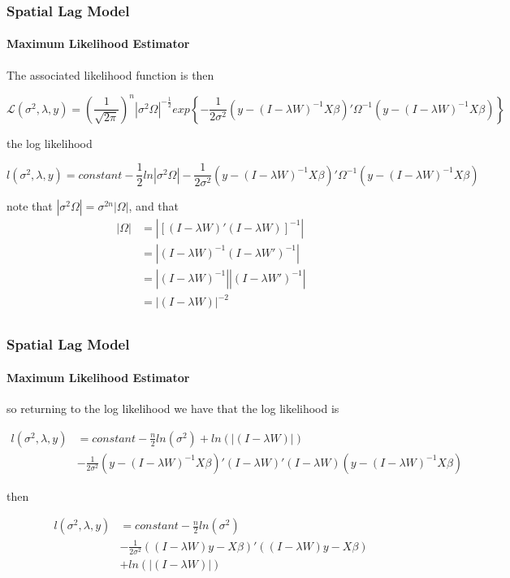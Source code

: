 \documentclass[
  shownotes,
  xcolor={svgnames},
  hyperref={colorlinks,citecolor=DarkBlue,linkcolor=DarkRed,urlcolor=DarkBlue}
  , aspectratio=169]{beamer}
\begin{document}
\begin{frame}[fragile]
\frametitle{Spatial Lag Model}
\framesubtitle{Maximum Likelihood Estimator}


The associated likelihood function is then
\begin{scriptsize}
\begin{equation}
\mathcal{L}\left(\sigma^{2},\lambda,y\right)=\left(\frac{1}{\sqrt{2\pi}}\right)^{n}|\sigma^{2}\Omega|^{-\frac{1}{2}}exp\left\{ -\frac{1}{2\sigma^{2}}(y-(I-\lambda W)^{-1}X\beta)'\Omega^{-1}(y-(I-\lambda W)^{-1}X\beta)\right\}  \nonumber
\end{equation}
\end{scriptsize}


the log likelihood

\begin{scriptsize}
\begin{equation}
l\left(\sigma^{2},\lambda,y\right)=constant-\frac{1}{2}ln|\sigma^{2}\Omega|-\frac{1}{2\sigma^{2}}(y-(I-\lambda W)^{-1}X\beta)'\Omega^{-1}(y-(I-\lambda W)^{-1}X\beta) \nonumber
\end{equation}
\end{scriptsize}

note that $|\sigma^{2}\Omega|=\sigma^{2n}|\Omega|$, and that 
\begin{align}
|\Omega| &= |[(I-\lambda W)'(I-\lambda W)]^{-1}| \nonumber \\
&= |(I-\lambda W)^{-1}(I-\lambda W')^{-1}| \nonumber \\
&=|(I-\lambda W)^{-1}||(I-\lambda W')^{-1}| \nonumber \\
&=|(I-\lambda W)|^{-2} \nonumber \\
\end{align}

\end{frame}
\begin{frame}[fragile]
\frametitle{Spatial Lag Model}
\framesubtitle{Maximum Likelihood Estimator}


so returning to the log likelihood we have that  the log likelihood is 

\begin{align}
l\left(\sigma^{2},\lambda,y\right)&=constant-\frac{n}{2}ln\left(\sigma^{2}\right)+ln\left(|(I-\lambda W)|\right) \nonumber \\
&-\frac{1}{2\sigma^{2}}\left(y-(I-\lambda W)^{-1}X\beta\right)'(I-\lambda W)'(I-\lambda W)\left(y-(I-\lambda W)^{-1}X\beta\right)
\end{align}

then 

\begin{align}
l\left(\sigma^{2},\lambda,y\right)&=constant-\frac{n}{2}ln\left(\sigma^{2}\right) \nonumber \\
&-\frac{1}{2\sigma^{2}}\left((I-\lambda W)y-X\beta\right)'\left((I-\lambda W)y-X\beta\right) \nonumber \\
&+ln\left(|(I-\lambda W)|\right)
\end{align}


\end{frame}
\end{document}
